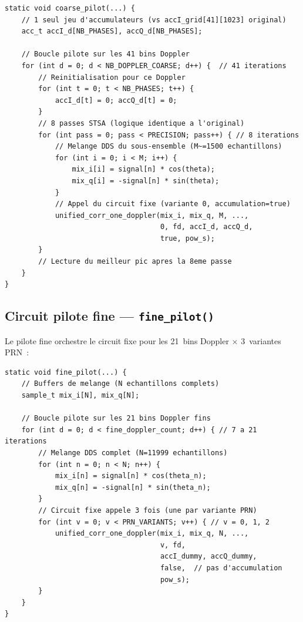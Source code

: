 \documentclass[11pt,a4paper]{article}
\begin{document}
\begin{lstlisting}[caption={Structure du pilote coarse}]
static void coarse_pilot(...) {
    // 1 seul jeu d'accumulateurs (vs accI_grid[41][1023] original)
    acc_t accI_d[NB_PHASES], accQ_d[NB_PHASES];

    // Boucle pilote sur les 41 bins Doppler
    for (int d = 0; d < NB_DOPPLER_COARSE; d++) {  // 41 iterations
        // Reinitialisation pour ce Doppler
        for (int t = 0; t < NB_PHASES; t++) {
            accI_d[t] = 0; accQ_d[t] = 0;
        }
        // 8 passes STSA (logique identique a l'original)
        for (int pass = 0; pass < PRECISION; pass++) { // 8 iterations
            // Melange DDS du sous-ensemble (M~=1500 echantillons)
            for (int i = 0; i < M; i++) {
                mix_i[i] = signal[n] * cos(theta);
                mix_q[i] = -signal[n] * sin(theta);
            }
            // Appel du circuit fixe (variante 0, accumulation=true)
            unified_corr_one_doppler(mix_i, mix_q, M, ...,
                                     0, fd, accI_d, accQ_d,
                                     true, pow_s);
        }
        // Lecture du meilleur pic apres la 8eme passe
    }
}
\end{lstlisting}

\subsection{Circuit pilote fine --- \texttt{fine\_pilot()}}

Le pilote fine orchestre le circuit fixe pour les 21~bins Doppler $\times$ 3~variantes PRN~:

\begin{lstlisting}[caption={Structure du pilote fine}]
static void fine_pilot(...) {
    // Buffers de melange (N echantillons complets)
    sample_t mix_i[N], mix_q[N];

    // Boucle pilote sur les 21 bins Doppler fins
    for (int d = 0; d < fine_doppler_count; d++) { // 7 a 21 iterations
        // Melange DDS complet (N=11999 echantillons)
        for (int n = 0; n < N; n++) {
            mix_i[n] = signal[n] * cos(theta_n);
            mix_q[n] = -signal[n] * sin(theta_n);
        }
        // Circuit fixe appele 3 fois (une par variante PRN)
        for (int v = 0; v < PRN_VARIANTS; v++) { // v = 0, 1, 2
            unified_corr_one_doppler(mix_i, mix_q, N, ...,
                                     v, fd,
                                     accI_dummy, accQ_dummy,
                                     false,  // pas d'accumulation
                                     pow_s);
        }
    }
}
\end{lstlisting}
\end{document}
